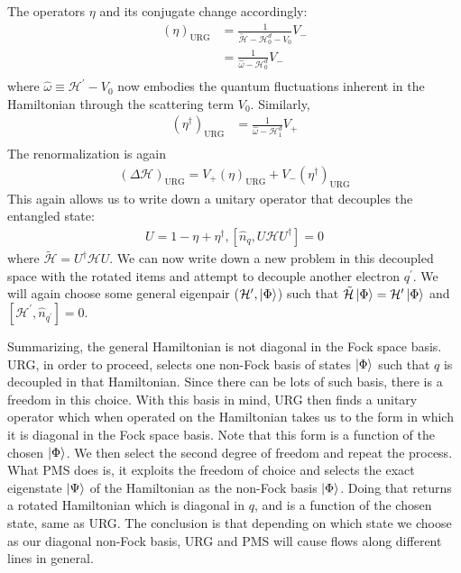 The operators \(\eta\) and its conjugate change accordingly:
\begin{equation}\begin{aligned}
	\left(\eta\right)_\text{URG} &= \frac{1}{\tilde{\mathcal{H}} - \mathcal{H}^d_0 - V_0}V_-\\
     &= \frac{1}{\hat \omega - \mathcal{H}^d_0}V_-\\
\end{aligned}\end{equation}
where \(\hat \omega \equiv \mathcal{H}^\prime - V_0\) now embodies the quantum fluctuations inherent in the Hamiltonian through the scattering term \(V_0\). Similarly,
\begin{equation}\begin{aligned}
	\left(\eta^\dagger\right)_\text{URG} &= \frac{1}{\hat \omega - \mathcal{H}^d_1}V_+\\
\end{aligned}\end{equation}
The renormalization is again
\begin{equation}\begin{aligned}
	\left(\Delta \mathcal{H}\right)_\text{URG} = V_+\left(\eta\right)_\text{URG} + V_-\left(\eta^\dagger\right)_\text{URG}
\end{aligned}\end{equation}
This again allows us to write down a unitary operator that decouples the entangled state:
\begin{equation}\begin{aligned}
	U =  1 - \eta + \eta^\dagger, \left[\hat n_q, U \mathcal{H} U^\dagger\right] = 0
\end{aligned}\end{equation}
where \(\tilde{\mathcal{H}} = U^\dagger \mathcal{H} U\). We can now write down a new problem in this decoupled space with the rotated items and attempt to decouple another electron \(q^\prime\). We will again choose some general eigenpair (\(\mathcal{H}^\prime,\ket{\Phi}\)) such that \(\tilde{\mathcal{H}}\ket{\Phi} = \mathcal{H}^{\prime}\ket{\Phi}\) and \(\left[\mathcal{H}^{\prime},\hat n_{q^\prime}\right]=0\).

Summarizing, the general Hamiltonian is not diagonal in the Fock space basis.
URG, in order to proceed, selects one non-Fock basis of states \(\ket{\Phi}\) such that \(q\) is decoupled in that Hamiltonian.
Since there can be lots of such basis, there is a freedom in this choice.
With this basis in mind, URG then finds a unitary operator which when operated on the Hamiltonian takes us to the form in which it is diagonal in the Fock space basis.
Note that this form is a function of the chosen \(\ket{\Phi}\).
We then select the second degree of freedom and repeat the process.
What PMS does is, it exploits the freedom of choice and selects the exact eigenstate \(\ket{\Psi}\) of the Hamiltonian as the non-Fock basis \(\ket{\Phi}\).
Doing that returns a rotated Hamiltonian which is diagonal in \(q\), and is a function of the chosen state, same as URG. The conclusion is that depending on which state we choose as our diagonal non-Fock basis, URG and PMS will cause flows along different lines in general.

